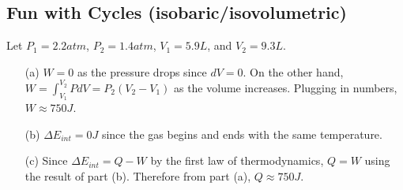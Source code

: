 \documentclass{article}
\begin{document}
\subsection{Fun with Cycles (isobaric/isovolumetric)}

Let $P_1 = 2.2 atm$, $P_2 = 1.4 atm$, $V_1 = 5.9 L$, and $V_2 = 9.3 L$.
\begin{itemize}
	\item[(a)] $W = 0$ as the pressure drops since $dV = 0$. On the other hand, $W = \int_{V_1}^{V_2}PdV = P_2 (V_2 - V_1)$ as the volume increases. Plugging in numbers, $W\approx 750 J$.
	\item[(b)] $\Delta E_{int} = 0 J$ since the gas begins and ends with the same temperature.
	\item[(c)] Since $\Delta E_{int} = Q - W$ by the first law of thermodynamics, $Q = W$ using the result of part (b). Therefore from part (a), $Q\approx 750 J$.
\end{itemize}
\end{document}
